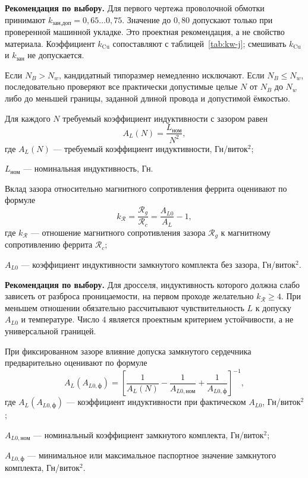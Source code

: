 \documentclass[14pt,a4paper]{extarticle}
\newcommand{\recommend}{\par\noindent\textbf{Рекомендация по выбору.} }
\begin{document}
\recommend Для первого чертежа проволочной обмотки принимают
$k_{\text{зан,доп}}=0{,}65\ldots0{,}75$. Значение до $0{,}80$ допускают
только при проверенной машинной укладке. Это проектная рекомендация,
а не свойство материала. Коэффициент $k_{\text{Cu}}$ сопоставляют с
таблицей~\ref{tab:kw-j}; смешивать $k_{\text{Cu}}$ и $k_{\text{зан}}$
не допускается.

Если $N_B>N_w$, кандидатный типоразмер немедленно исключают. Если
$N_B\leq N_w$, последовательно проверяют все практически допустимые
целые $N$ от $N_B$ до $N_w$ либо до меньшей границы, заданной длиной
провода и допустимой ёмкостью.

Для каждого $N$ требуемый коэффициент индуктивности с зазором равен
\begin{equation}
 A_L(N)=\frac{L_{\text{ном}}}{N^2},
 \label{eq:al-required}
\end{equation}
где $A_L(N)$ --- требуемый коэффициент индуктивности, Гн/виток$^2$;\par\noindent
$L_{\text{ном}}$ --- номинальная индуктивность, Гн.

Вклад зазора относительно магнитного сопротивления феррита оценивают по
формуле
\begin{equation}
 k_{\mathcal R}=
 \frac{\mathcal R_g}{\mathcal R_c}
 =\frac{A_{L0}}{A_L}-1,
 \label{eq:gap-reluctance-ratio}
\end{equation}
где $k_{\mathcal R}$ --- отношение магнитного сопротивления зазора
$\mathcal R_g$ к магнитному сопротивлению феррита $\mathcal R_c$;\par\noindent
$A_{L0}$ --- коэффициент индуктивности замкнутого комплекта без зазора,
Гн/виток$^2$.

\recommend Для дросселя, индуктивность которого должна слабо зависеть
от разброса проницаемости, на первом проходе желательно
$k_{\mathcal R}\geq4$. При меньшем отношении обязательно рассчитывают
чувствительность $L$ к допуску $A_{L0}$ и температуре. Число $4$
является проектным критерием устойчивости, а не универсальной границей.

При фиксированном зазоре влияние допуска замкнутого сердечника
предварительно оценивают по формуле
\begin{equation}
 A_L(A_{L0,\text{ф}})=
 \left[
 \frac{1}{A_L(N)}
 -\frac{1}{A_{L0,\text{ном}}}
 +\frac{1}{A_{L0,\text{ф}}}
 \right]^{-1},
 \label{eq:al0-tolerance-sensitivity}
\end{equation}
где $A_L(A_{L0,\text{ф}})$ --- коэффициент индуктивности при
фактическом $A_{L0}$, Гн/виток$^2$;\par\noindent
$A_{L0,\text{ном}}$ --- номинальный коэффициент замкнутого комплекта,
Гн/виток$^2$;\par\noindent
$A_{L0,\text{ф}}$ --- минимальное или максимальное паспортное значение
замкнутого комплекта, Гн/виток$^2$.
\end{document}

